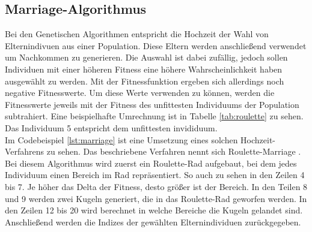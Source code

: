 \subsection{Marriage-Algorithmus}
Bei den Genetischen Algorithmen entspricht die Hochzeit der Wahl von Elternindivuen aus einer Population. Diese Eltern werden anschließend verwendet um Nachkommen zu generieren. 
Die Auswahl ist dabei zufällig, jedoch sollen Individuen mit einer höheren Fitness eine höhere Wahrscheinlichkeit haben ausgewählt zu werden. 
Mit der Fitnessfunktion ergeben sich allerdings noch negative Fitnesswerte. Um diese Werte verwenden zu können, werden die Fitnesswerte jeweils mit der Fitness des unfittesten Individuums der Population subtrahiert. Eine beispielhafte Umrechnung ist in Tabelle \ref{tab:roulette} zu sehen. Das Individuum 5 entspricht dem unfittesten invididuum. \\
Im Codebeispiel \ref{lst:marriage} ist eine Umsetzung eines solchen Hochzeit-Verfahrens zu sehen. Das beschriebene Verfahren nennt sich Roulette-Marriage \cite[S. 204]{schoeneburg}. Bei diesem Algorithmus wird zuerst ein Roulette-Rad aufgebaut, bei dem jedes Individuum einen Bereich im Rad repräsentiert.
So auch zu sehen in den Zeilen 4 bis 7. Je höher das Delta der Fitness, desto größer ist der Bereich. In den Teilen 8 und 9 werden zwei Kugeln generiert, die in das Roulette-Rad geworfen werden. In den Zeilen 12 bis 20 wird berechnet in welche Bereiche die Kugeln gelandet sind. Anschließend werden die Indizes der 
gewählten Elternindividuen zurückgegeben.

